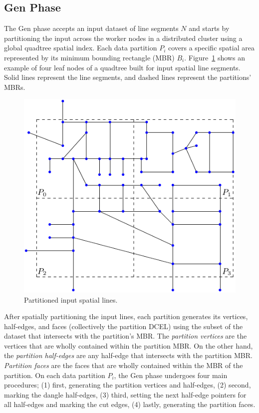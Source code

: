 \subsection{Gen Phase}
\label{sec:gen}

The Gen phase accepts an input dataset of line segments $N$ and starts by partitioning the input across the worker nodes in a distributed cluster using a global quadtree spatial index.
Each data partition $P_i$ covers a specific spatial area represented by its minimum bounding rectangle (MBR) $B_i$.
Figure~\ref{fig:ddcel:input} shows an example of four leaf nodes of a quadtree built for input spatial line segments. Solid lines represent the line segments, and dashed lines represent the partitions' MBRs.

\begin{figure}[tb]
	\centering
	\includegraphics[width=0.75 \linewidth ]{chapter2/model/input-network}
	\caption{Partitioned input spatial lines.}
	\label{fig:ddcel:input}
\end{figure}

After spatially partitioning the input lines, each partition generates its vertices, half-edges, and faces (collectively the partition DCEL) using the subset of the dataset that intersects with the partition's MBR.
The \textit{partition vertices} are the vertices that are wholly contained within the partition MBR. 
On the other hand, the \textit{partition half-edges} are any half-edge that intersects with the partition MBR.
\textit{Partition faces} are the faces that are wholly contained within the MBR of the partition.
On each data partition $P_i$, the Gen phase undergoes four main procedures; 
(1) first, generating the partition vertices and half-edges, 
(2) second, marking the dangle half-edges, 
(3) third, setting the next half-edge pointers for all half-edges and marking the cut edges, 
(4) lastly, generating the partition faces. 

